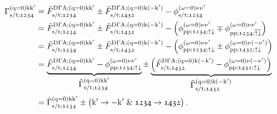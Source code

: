 \documentclass[main.tex]{subfiles}
\begin{document}
\begin{align}\label{eq:pairing_vertex_full_formula}
\begin{split}
	\Gamma_{\text{s}/\text{t};\mathfrak{1234}}^{(\text{q}=0)\text{k}\text{k}'}&=\tilde{F}_{\text{s}/\text{t};\mathfrak{1234}}^{\text{D}\Gamma\text{A};(\text{q}=0)\text{k}\text{k}'}\pm \tilde{F}_{\text{s}/\text{t};\mathfrak{1432}}^{\text{D}\Gamma\text{A};(\text{q}=0)\text{k}(-\text{k}')}-\phi_{\text{s}/\text{t};\mathfrak{1234}}^{(\omega=0)\nu\nu'}\\
	&=\tilde{F}_{\text{s}/\text{t};\mathfrak{1234}}^{\text{D}\Gamma\text{A};(\text{q}=0)\text{k}\text{k}'}\pm \tilde{F}_{\text{s}/\text{t};\mathfrak{1432}}^{\text{D}\Gamma\text{A};(\text{q}=0)\text{k}(-\text{k}')}-\left (\phi_{\text{pp};\mathfrak{1234};\uparrow\downarrow}^{(\omega=0)\nu\nu'}\mp \phi_{\text{pp};\mathfrak{1234};\overline{\uparrow\downarrow}}^{(\omega=0)\nu\nu'}\right )\\
	&=\tilde{F}_{\text{s}/\text{t};\mathfrak{1234}}^{\text{D}\Gamma\text{A};(\text{q}=0)\text{k}\text{k}'}\pm \tilde{F}_{\text{s}/\text{t};\mathfrak{1432}}^{\text{D}\Gamma\text{A};(\text{q}=0)\text{k}(-\text{k}')}-\left (\phi_{\text{pp};\mathfrak{1234};\uparrow\downarrow}^{(\omega=0)\nu\nu'}\pm \phi_{\text{pp};\mathfrak{1432};\uparrow\downarrow}^{(\omega=0)\nu(-\nu')}\right )\\
	&=\underbrace{\tilde{F}_{\text{s}/\text{t};\mathfrak{1234}}^{\text{D}\Gamma\text{A};(\text{q}=0)\text{k}\text{k}'}-\phi_{\text{pp};\mathfrak{1234};\uparrow\downarrow}^{(\omega=0)\nu\nu'}}_{\textstyle\tilde{\Gamma}_{\text{s}/\text{t};\mathfrak{1234}}^{(\text{q}=0)\text{k}\text{k}'}}\pm \underbrace{\left (\tilde{F}_{\text{s}/\text{t};\mathfrak{1432}}^{\text{D}\Gamma\text{A};(\text{q}=0)\text{k}(-\text{k}')}- \phi_{\text{pp};\mathfrak{1432};\uparrow\downarrow}^{(\omega=0)\nu(-\nu')}\right )}_{\textstyle\tilde{\Gamma}_{\text{s}/\text{t};\mathfrak{1432}}^{(\text{q}=0)\text{k}(-\text{k}')}}\\
	&=\tilde{\Gamma}_{\text{s}/\text{t};\mathfrak{1234}}^{(\text{q}=0)\text{k}\text{k}'}\pm \left (\text{k}'\rightarrow -\text{k}'\;\&\; \mathfrak{1234}\rightarrow\mathfrak{1432}\right ).
\end{split}
\end{align}

\newpage
\end{document}
